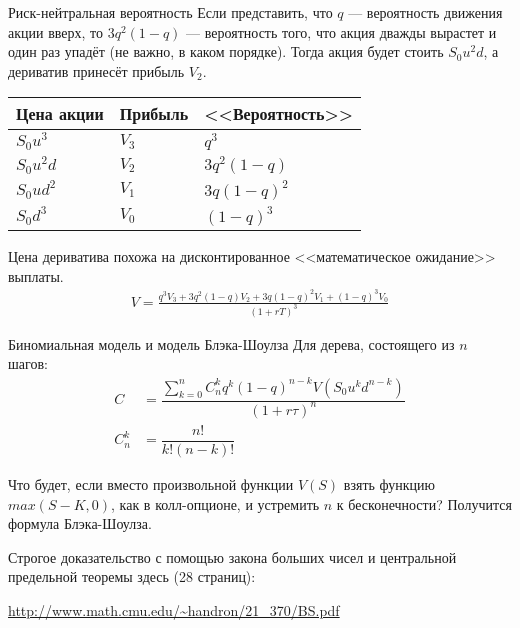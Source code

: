\documentclass{beamer}
\begin{document}
\begin{frame}{Риск-нейтральная вероятность}
\justify
Если представить, что $q$ --- вероятность движения акции вверх, то $3q^2(1-q)$ --- вероятность того, что акция дважды вырастет и один раз упадёт (не важно, в каком порядке). Тогда акция будет стоить $S_0u^2d$, а дериватив принесёт прибыль $V_2$.

\justify
\centering
\begin{tabular}{l|l|l}
Цена акции & Прибыль & <<Вероятность>> \\ \hline
$S_0u^3$   & $V_3$   & $q^3$ \\
$S_0u^2d$  & $V_2$   & $3q^2(1-q)$ \\
$S_0ud^2$  & $V_1$   & $3q(1-q)^2$ \\ 
$S_0d^3$   & $V_0$   & $(1-q)^3$ 
\end{tabular}

\justify
Цена дериватива похожа на дисконтированное <<математическое ожидание>> выплаты.
\begin{align*}
V = \frac{q^3V_3 + 3q^2(1-q)V_2 + 3q(1-q)^2V_1 + (1-q)^3V_0}{(1+rT)^3}
\end{align*}
\end{frame}



\begin{frame}{Биномиальная модель и модель Блэка-Шоулза}
Для дерева, состоящего из $n$ шагов:
\begin{align*}
C &= \dfrac{\sum\limits_{k=0}^{n} C^k_nq^k(1-q)^{n-k}V(S_0u^kd^{n-k})}{(1+r\tau)^n} \\
C^k_n &= \dfrac{n!}{k!(n-k)!}
\end{align*}

\justify
Что будет, если вместо произвольной функции $V(S)$ взять функцию $max(S-K,0)$, как в колл-опционе, и устремить $n$ к бесконечности? Получится формула Блэка-Шоулза.

\vspace{\baselineskip}
Строгое доказательство с помощью закона больших чисел и центральной
предельной теоремы здесь (28 страниц):

\url{http://www.math.cmu.edu/~handron/21_370/BS.pdf}
\end{frame}
\end{document}
